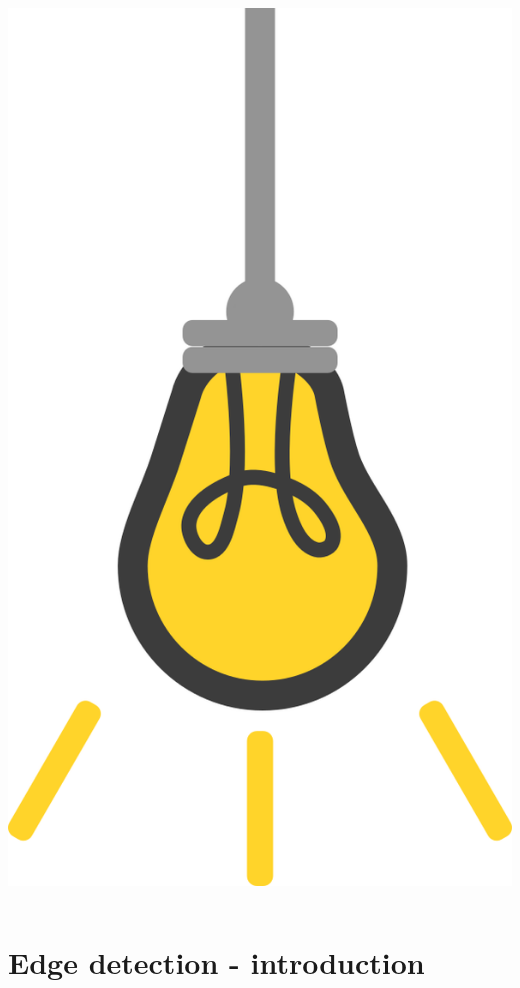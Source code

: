 \documentclass[9pt, aspectratio=169]{beamer}
\begin{document}
\begin{frame}
\begin{columns}
\begin{column}{0.2\textwidth}
            \includegraphics[angle=-30, origin=tr, width=1.5\textwidth]{lightbulb.png}
        \end{column}
    \end{columns}
\end{frame}

\section{Edge detection - introduction}
\end{document}
